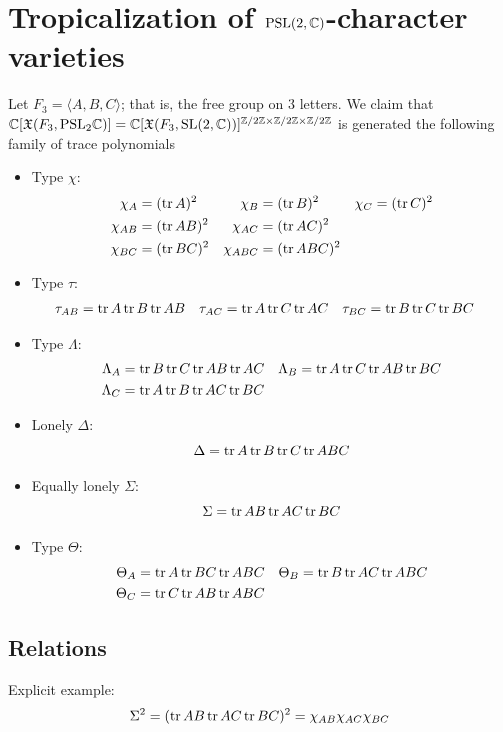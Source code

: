 \documentclass[11pt]{article}
\begin{document}
\section{Tropicalization of $\PSL(2,\bbC)$-character varieties}
Let $F_3=\langle A,B,C\rangle$; that is, the free group on $3$ letters. We
claim that
$\bbC[\frakX(F_3,\PSL_2\bbC)]=\bbC[\frakX(F_3,\SL(2,\bbC))]
^{\bbZ/2\bbZ\times\bbZ/2\bbZ\times\bbZ/2\bbZ}$ is generated the following
family of trace polynomials
\begin{itemize}[label=$\star$]
\item Type $\chi$:
  \begin{align*}
    \chi_A&=(\tr A)^2&\chi_B&=(\tr B)^2&\chi_C&=(\tr C)^2\\
    \chi_{AB}&=(\tr AB)^2&\chi_{AC}&=(\tr AC)^2 \\
    \chi_{BC}&=(\tr BC)^2&\chi_{ABC}&=(\tr ABC)^2
  \end{align*}
\item Type $\tau$:
  \begin{align*}
    \tau_{AB}&=\tr A\tr B\tr AB &\tau_{AC}&=\tr A\tr C\tr AC &\tau_{BC}&=\tr B\tr C\tr BC
  \end{align*}
\item Type $\Lambda$:
  \begin{align*}
    \Lambda_A&=\tr B\tr C\tr AB\tr AC
    &\Lambda_B&=\tr A\tr C\tr AB\tr BC\\
    \Lambda_C&=\tr A\tr B\tr AC\tr BC
  \end{align*}
\item Lonely $\Delta$:
  \[
    \Delta= \tr A\tr B\tr C\tr ABC
  \]
\item Equally lonely $\Sigma$:
  \[
    \Sigma= \tr AB\tr AC\tr BC
  \]
\item Type $\Theta$:
  \begin{align*}
    \Theta_A&=\tr A\tr BC\tr ABC&\Theta_B&=\tr B\tr AC\tr ABC \\
    \Theta_C&=\tr C\tr AB\tr ABC
  \end{align*}
\end{itemize}
\subsection{Relations}
Explicit example:
\[
\Sigma ^2=(\tr AB\tr AC\tr BC)^2=\chi_{AB}\chi_{AC}\chi_{BC}
\]
\end{document}
